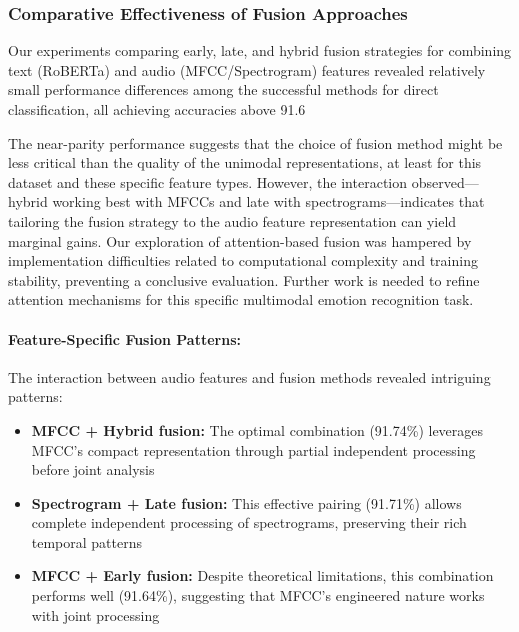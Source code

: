 \documentclass[12pt]{article}
\begin{document}
\subsubsection{Comparative Effectiveness of Fusion Approaches}
Our experiments comparing early, late, and hybrid fusion strategies for combining text (RoBERTa) and audio (MFCC/Spectrogram) features revealed relatively small performance differences among the successful methods for direct classification, all achieving accuracies above 91.6%

The near-parity performance suggests that the choice of fusion method might be less critical than the quality of the unimodal representations, at least for this dataset and these specific feature types. However, the interaction observed—hybrid working best with MFCCs and late with spectrograms—indicates that tailoring the fusion strategy to the audio feature representation can yield marginal gains. Our exploration of attention-based fusion was hampered by implementation difficulties related to computational complexity and training stability, preventing a conclusive evaluation. Further work is needed to refine attention mechanisms for this specific multimodal emotion recognition task.

\paragraph{Feature-Specific Fusion Patterns:}
The interaction between audio features and fusion methods revealed intriguing patterns:

\begin{itemize}
    \item \textbf{MFCC + Hybrid fusion:} The optimal combination (91.74\%) leverages MFCC's compact representation through partial independent processing before joint analysis
    
    \item \textbf{Spectrogram + Late fusion:} This effective pairing (91.71\%) allows complete independent processing of spectrograms, preserving their rich temporal patterns
    
    \item \textbf{MFCC + Early fusion:} Despite theoretical limitations, this combination performs well (91.64\%), suggesting that MFCC's engineered nature works with joint processing
\end{itemize}
\end{document}
